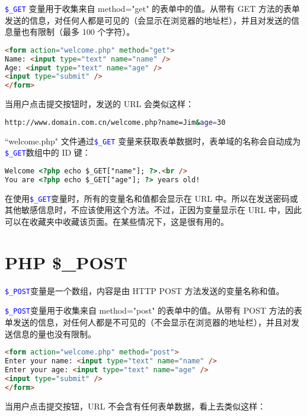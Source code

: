 \textcolor{Blue}{\texttt{\$\_GET}} 变量用于收集来自 method="get" 的表单中的值。从带有 GET 方法的表单发送的信息，对任何人都是可见的（会显示在浏览器的地址栏），并且对发送的信息量也有限制（最多 100 个字符）。

\begin{lstlisting}[language=HTML]
<form action="welcome.php" method="get">
Name: <input type="text" name="name" />
Age: <input type="text" name="age" />
<input type="submit" />
</form>
\end{lstlisting}

当用户点击提交按钮时，发送的 URL 会类似这样：

\begin{lstlisting}[language=bash]
http://www.domain.com.cn/welcome.php?name=Jim&age=30
\end{lstlisting}

``welcome.php" 文件通过\textcolor{Blue}{\texttt{\$\_GET}} 变量来获取表单数据时，表单域的名称会自动成为\textcolor{Blue}{\texttt{\$\_GET}}数组中的 ID 键：

\begin{lstlisting}[language=HTML]
Welcome <?php echo $_GET["name"]; ?>.<br />
You are <?php echo $_GET["age"]; ?> years old!
\end{lstlisting}

在使用\textcolor{Blue}{\texttt{\$\_GET}}变量时，所有的变量名和值都会显示在 URL 中。所以在发送密码或其他敏感信息时，不应该使用这个方法。不过，正因为变量显示在 URL 中，因此可以在收藏夹中收藏该页面。在某些情况下，这是很有用的。


\chapter{PHP \$\_POST}

\textcolor{Blue}{\texttt{\$\_POST}}变量是一个数组，内容是由 HTTP POST 方法发送的变量名称和值。



\textcolor{Blue}{\texttt{\$\_POST}}变量用于收集来自 method="post" 的表单中的值。从带有 POST 方法的表单发送的信息，对任何人都是不可见的（不会显示在浏览器的地址栏），并且对发送信息的量也没有限制。

\begin{lstlisting}[language=HTML]
<form action="welcome.php" method="post">
Enter your name: <input type="text" name="name" />
Enter your age: <input type="text" name="age" />
<input type="submit" />
</form>
\end{lstlisting}

当用户点击提交按钮，URL 不会含有任何表单数据，看上去类似这样：


